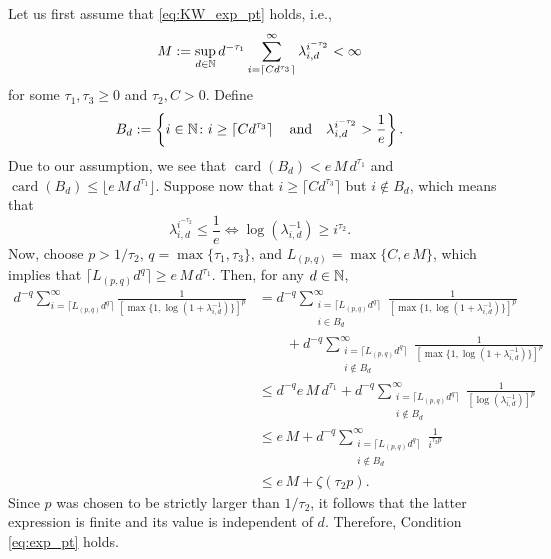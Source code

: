 \documentclass[sort&compress]{elsarticle}
\DeclareMathOperator{\card}{card}
\begin{document}
{Let us first assume that \eqref{eq:KW_exp_pt} holds, i.e.,
\[
M:=\sup_{d\in\mathbb{N}} d^{-\tau_1} \sum_{i=\lceil C d^{\tau_3} \rceil}^{\infty} \lambda_{i,d}^{i^{-\tau_2}} < \infty
\]
for some $\tau_1,\tau_3\ge 0$ and $\tau_2, C>0$.
Define
\[
B_d:=\left\{i\in\mathbb{N} \colon i\ge \left\lceil Cd^{\tau_3}\right\rceil\quad\mbox{and}\quad
\lambda_{i,d}^{i^{-\tau_2}}>\frac{1}{e}\right\}.
\]
Due to our assumption, we see that $\card(B_d) < e\,M\,d^{\tau_1}$ and $\card(B_d)\le \lfloor e\,M\,d^{\tau_1} \rfloor$. Suppose now that $i\ge \lceil C d^{\tau_3}\rceil$ but $i\not\in B_d$, which means that
\[\lambda_{i,d}^{i^{-\tau_2}} \le \frac{1}{e} \iff \log (\lambda_{i,d}^{-1})\ge i^{\tau_2}.\]
Now, choose $p> 1/\tau_2$, $q=\max\{\tau_1,\tau_3\}$, and $L_{(p,q)}=\max\{C, e\, M\}$, which implies that $\lceil L_{(p,q)} d^{q}\rceil \ge e\, M\, d^{\tau_1}$. Then, for any $d\in\mathbb{N}$,
\begin{align*}
d^{-q} \sum_{i=\lceil L_{(p,q)} d^{q}\rceil}^\infty \frac{1}{[\max\{1,\log(1+\lambda_{i,d}^{-1})\}]^p}&=d^{-q} \sum_{\substack{i=\lceil L_{(p,q)} d^{q}\rceil\\ i\in B_d}}^\infty \frac{1}{[\max\{1,\log(1+\lambda_{i,d}^{-1})\}]^p}\\
&\qquad  + d^{-q} \sum_{\substack{i=\lceil L_{(p,q)} d^{q}\rceil\\ i\not\in B_d}}^\infty \frac{1}{[\max\{1,\log(1+\lambda_{i,d}^{-1})\}]^p}\\
&\le d^{-q} e\, M\, d^{\tau_1} + d^{-q}\sum_{\substack{i=\lceil L_{(p,q)} d^{q}\rceil\\ i\not\in B_d}}^\infty \frac{1}{[\log (\lambda_{i,d}^{-1})]^p}\\
&\le e\, M + d^{-q}\sum_{\substack{i=\lceil L_{(p,q)} d^{q}\rceil\\ i\not\in B_d}}^\infty \frac{1}{i^{\tau_2 p}}\\
&\le  e\, M + \zeta (\tau_2 p).
\end{align*}
Since $p$ was chosen to be strictly larger than $1/\tau_2$, it follows that the latter expression is finite and its value is independent of $d$. Therefore, Condition \eqref{eq:exp_pt} holds.

}
\end{document}
